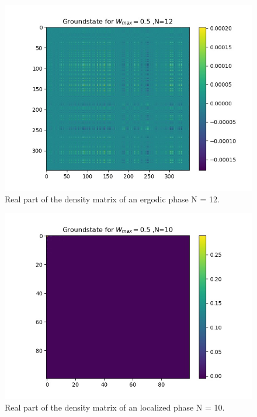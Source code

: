 \documentclass[reprint,amsmath,amssymb,aps,prb]{revtex4-2}
\begin{document}
\begin{figure}[h!]
	\includegraphics[width=\linewidth]{../results/N12_trainingset_groundstate_Wmax0.5.jpg}
	\caption{Real part of the density matrix of an ergodic phase N = 12.}
\end{figure}
\begin{figure}[h!]
	\includegraphics[width=\linewidth]{../results/N10_trainingset_groundstate_Wmax8.0.jpg}
	\caption{Real part of the density matrix of an localized phase N = 10.}
\end{figure}
\end{document}
